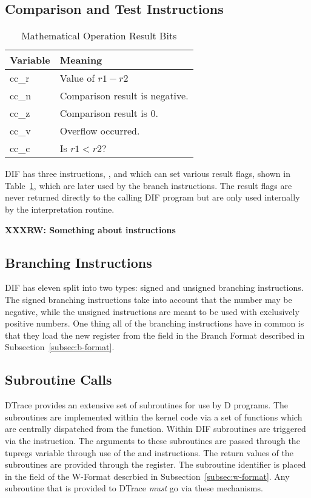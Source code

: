 \subsection{Comparison and Test Instructions}
\label{sec:dif-cmp-tst}

\begin{table}
  \centering
    \begin{tabular}{|l|l|}
      \hline
      Variable & Meaning\\
      \hline
      cc\_r & Value of $r1 - r2$\\
      cc\_n & Comparison result is negative. \\
      cc\_z & Comparison result is 0.\\
      cc\_v & Overflow occurred.\\
      cc\_c & Is $r1 < r2$?\\
      \hline
  \end{tabular}
\label{tbl:cmp-vars}
\caption{Mathematical Operation Result Bits}
\end{table}

DIF has three instructions, ,  and
 which can set various result flags, shown in
Table~\ref{tbl:cmp-vars}, which are later used by the branch
instructions.  The result flags are never returned directly to the
calling DIF program but are only used internally by the interpretation
routine.

\textbf{XXXRW: Something about instructions}

\subsection{Branching Instructions}

DIF has eleven split into two types: signed and unsigned branching instructions.
The signed branching instructions take into account that the number may be
negative, while the unsigned instructions are meant to be used with exclusively
positive numbers. One thing all of the branching instructions have in common is
that they load the new  register from the  field
in the Branch Format described in Subsection~\ref{subsec:b-format}.

\subsection{Subroutine Calls}
\label{sec:subroutines}

DTrace provides an extensive set of subroutines for use by D programs.  The
subroutines are implemented within the kernel code via a set of functions which
are centrally dispatched from the  function.  Within
DIF subroutines are triggered via the  instruction. The
arguments to these subroutines are passed through the tupregs variable through
use of the  and  instructions. The
return values of the subroutines are provided through the 
register. The subroutine identifier is placed in the  field of
the W-Format descrbied in Subsection~\ref{subsec:w-format}. Any subroutine that
is provided to DTrace \emph{must} go via these mechanisms.

